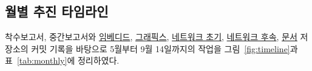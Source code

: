 \documentclass[11pt,a4paper]{article}
\begin{document}
\subsection{월별 추진 타임라인}

착수보고서, 중간보고서와
\href{https://github.com/2026-PNU-CSE-GRAD-RFVisualizer/Embedded/commits}{임베디드},
\href{https://github.com/2026-PNU-CSE-GRAD-RFVisualizer/RFVisualizer/commits}{그래픽스},
\href{https://github.com/2026-PNU-CSE-GRAD-RFVisualizer/Network-Backend/commits}{네트워크 초기},
\href{https://github.com/2026-PNU-CSE-GRAD-RFVisualizer/Network-Backend-Article/commits}{네트워크 후속},
\href{https://github.com/2026-PNU-CSE-GRAD-RFVisualizer/RFVisualizer-Docs/commits}{문서} 저장소의 커밋 기록을 바탕으로
5월부터 9월 14일까지의 작업을 그림~\ref{fig:timeline}과 표~\ref{tab:monthly}에 정리하였다.
\end{document}
